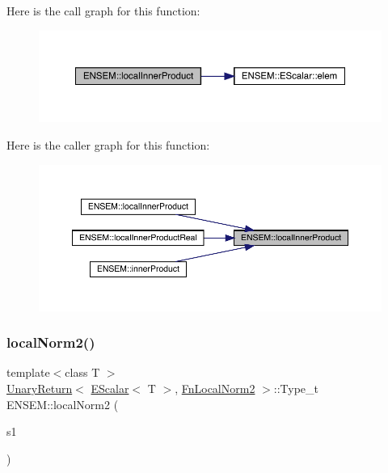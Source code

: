 Here is the call graph for this function\+:
\nopagebreak
\begin{figure}[H]
\begin{center}
\leavevmode
\includegraphics[width=350pt]{d4/dca/group__escalar_ga0013b1f4312c45e970912e4df1f55f65_cgraph}
\end{center}
\end{figure}
Here is the caller graph for this function\+:
\nopagebreak
\begin{figure}[H]
\begin{center}
\leavevmode
\includegraphics[width=350pt]{d4/dca/group__escalar_ga0013b1f4312c45e970912e4df1f55f65_icgraph}
\end{center}
\end{figure}
\mbox{\label{group__escalar_ga5612cd39905e848db7ef691d10437811}} 
\subsubsection{\texorpdfstring{localNorm2()}{localNorm2()}}
{\footnotesize\ttfamily template$<$class T $>$ \\
\mbox{\hyperlink{structENSEM_1_1UnaryReturn}{Unary\+Return}}$<$ \mbox{\hyperlink{classENSEM_1_1EScalar}{E\+Scalar}}$<$ T $>$, \mbox{\hyperlink{structENSEM_1_1FnLocalNorm2}{Fn\+Local\+Norm2}} $>$\+::Type\+\_\+t E\+N\+S\+E\+M\+::local\+Norm2 (\begin{DoxyParamCaption}\item[{const \mbox{\hyperlink{classENSEM_1_1EScalar}{E\+Scalar}}$<$ T $>$ \&}]{s1 }\end{DoxyParamCaption})\hspace{0.3cm}{\ttfamily [inline]}}

